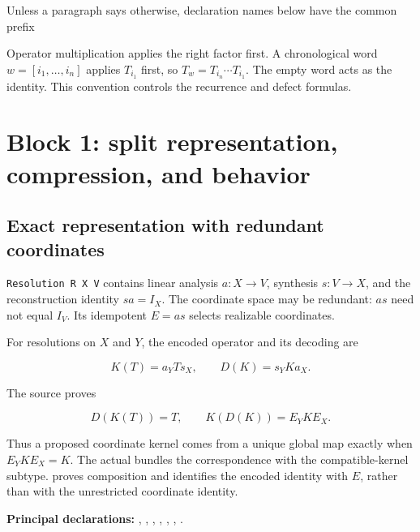 \documentclass[11pt]{article}
\begin{document}
Unless a paragraph says otherwise, declaration names below have the
common prefix

\texttt{}

Operator multiplication applies the right factor first. A chronological
word \(w=[i_1,\ldots,i_n]\) applies \(T_{i_1}\) first, so
\(T_w=T_{i_n}\cdots T_{i_1}\). The empty word acts as the identity. This
convention controls the recurrence and defect formulas.

\hypertarget{block-1-split-representation-compression-and-behavior}{%
\section{Block 1: split representation, compression, and
behavior}\label{block-1-split-representation-compression-and-behavior}}

\hypertarget{exact-representation-with-redundant-coordinates}{%
\subsection{Exact representation with redundant
coordinates}\label{exact-representation-with-redundant-coordinates}}

\texttt{Resolution R X V} contains linear analysis
\(a:X\to V\), synthesis \(s:V\to X\), and the reconstruction identity
\(sa=I_X\). The coordinate space may be redundant: \(as\) need not equal
\(I_V\). Its idempotent \(E=as\) selects realizable coordinates.

For resolutions on \(X\) and \(Y\), the encoded operator and its
decoding are

\[
K(T)=a_YTs_X,\qquad D(K)=s_YKa_X.
\]

The source proves

\[
D(K(T))=T,\qquad K(D(K))=E_YKE_X.
\]

Thus a proposed coordinate kernel comes from a unique global map exactly
when \(E_YKE_X=K\). The actual
\texttt{} bundles the
correspondence with the compatible-kernel subtype.
\texttt{} proves composition and
\texttt{} identifies the encoded
identity with \(E\), rather than with the unrestricted coordinate
identity.

\textbf{Principal declarations:}
\texttt{},
\texttt{},
\texttt{},
\texttt{},
\texttt{},
\texttt{},
\texttt{}.
\end{document}
